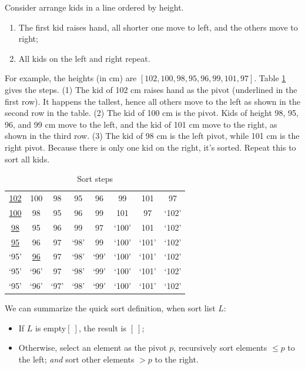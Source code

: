 \documentclass[b5paper]{article}
\begin{document}
Consider arrange kids in a line ordered by height.

\begin{enumerate}
\item The first kid raises hand, all shorter one move to left, and the others move to right;
\item All kids on the left and right repeat.
\end{enumerate}

For example, the heights (in cm) are $[102, 100, 98, 95, 96, 99, 101, 97]$. Table \ref{tab:kids-sort} gives the steps. (1) The kid of 102 cm raises hand as the pivot (underlined in the first row). It happens the tallest, hence all others move to the left as shown in the second row in the table. (2) The kid of 100 cm is the pivot. Kids of height 98, 95, 96, and 99 cm move to the left, and the kid of 101 cm move to the right, as shown in the third row. (3) The kid of 98 cm is the left pivot, while 101 cm is the right pivot. Because there is only one kid on the right, it's sorted. Repeat this to sort all kids.

\begin{table}[htbp]
\centering
\begin{tabular}{ | c c c c c c c c |}
\hline
\underline{102} & 100 & 98 & 95 & 96 & 99 & 101 & 97 \\
\underline{100} & 98 & 95 & 96 & 99 & 101 & 97 & `102' \\
\underline{98} & 95 & 96 & 99 & 97 & `100' & 101 & `102' \\
\underline{95} & 96 & 97 & `98' & 99 & `100' & `101' & `102' \\
`95' & \underline{96} & 97 & `98' & `99' & `100' & `101' & `102' \\
`95' & `96' & 97 & `98' & `99' & `100' & `101' & `102' \\
`95' & `96' & `97' & `98' & `99' & `100' & `101' & `102' \\
\hline
\end{tabular}
\caption{Sort steps}
\label{tab:kids-sort}
\end{table}

We can summarize the quick sort definition, when sort list $L$:

\begin{itemize}
\item If $L$ is empty$[\ ]$, the result is $[\ ]$;
\item Otherwise, select an element as the pivot $p$, recursively sort elements $\leq p$ to the left; {\em and} sort other elements $> p$ to the right.
\end{itemize}
\end{document}
